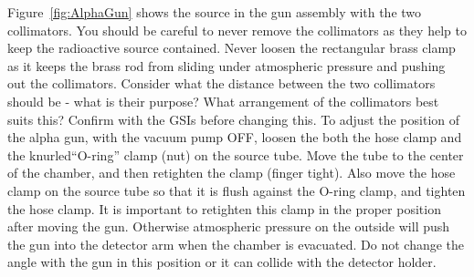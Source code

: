 \documentclass{../lab}
\begin{document}
\begin{enumerate}
    
    Figure~\ref{fig:AlphaGun} shows the source in the gun assembly with the two collimators. You should be careful to never remove the collimators as they help to keep the radioactive source contained. Never loosen the rectangular brass clamp as it keeps the brass rod from sliding under atmospheric pressure and pushing out the collimators. Consider what the distance between the two collimators should be - what is their purpose? What arrangement of the collimators best suits this? Confirm with the GSIs before changing this. To adjust the position of the alpha gun, with the vacuum pump OFF, loosen the both the hose clamp and the knurled``O-ring'' clamp (nut) on the source tube. Move the tube to the center of the chamber, and then retighten the clamp (finger tight). Also move the hose clamp on the source tube so that it is flush against the O-ring clamp, and tighten the hose clamp. It is important to retighten this clamp in the proper position after moving the gun. Otherwise atmospheric pressure on the outside will push the gun into the detector arm when the chamber is evacuated. Do not change the angle with the gun in this position or it can collide with the detector holder.



\end{enumerate}
\end{document}
